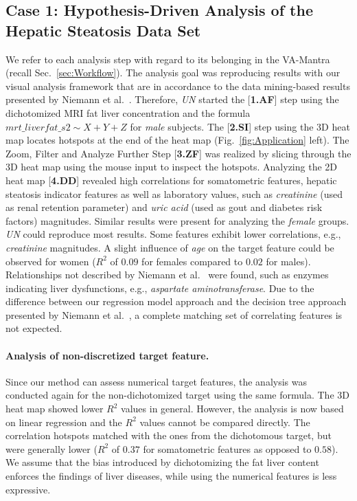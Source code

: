 \documentclass[journal]{style/vgtc} 			          %
\begin{document}
\subsection{Case 1: Hypothesis-Driven Analysis of the Hepatic Steatosis Data Set}
We refer to each analysis step with regard to its belonging in the VA-Mantra (recall Sec.~\ref{sec:Workflow}).
The analysis goal was reproducing results with our visual analysis framework that are in accordance to the data mining-based results presented by Niemann et al.~\cite{Niemann2014}.
Therefore, \emph{UN} started the [\textbf{1.AF}] step using the dichotomized MRI fat liver concentration and the formula $mrt\_liverfat\_s2 \sim X + Y + Z$ for \emph{male} subjects.
The [\textbf{2.SI}] step using the 3D heat map locates hotspots at the end of the heat map (Fig.~\ref{fig:Application} left).
The Zoom, Filter and Analyze Further Step [\textbf{3.ZF}] was realized by slicing through the 3D heat map using the mouse input to inspect the hotspots.
Analyzing the 2D heat map [\textbf{4.DD}] revealed high correlations for somatometric features, hepatic steatosis indicator features as well as laboratory values, such as \emph{creatinine} (used as renal retention parameter) and \emph{uric acid} (used as gout and diabetes risk factors) magnitudes.
Similar results were present for analyzing the \emph{female} groups.
\emph{UN} could reproduce most results.
Some features exhibit lower correlations, e.g., \emph{creatinine} magnitudes.
A slight influence of \emph{age} on the target feature could be observed for women ($R^2$ of $0.09$ for females compared to $0.02$ for males).
Relationships not described by Niemann et al.~\cite{Niemann2014} were found, such as enzymes indicating liver dysfunctions, e.g., \emph{aspartate aminotransferase}.
%
Due to the difference between our regression model approach and the decision tree approach presented by Niemann et al.~\cite{Niemann2014}, a complete matching set of correlating features is not expected.

\paragraph{Analysis of non-discretized target feature.}
Since our method can assess numerical target features, the analysis was conducted again for the non-dichotomized target using the same formula.
The 3D heat map showed lower $R^2$ values in general.
However, the analysis is now based on linear regression and the $R^2$ values cannot be compared directly.
The correlation hotspots matched with the ones from the dichotomous target, but were generally lower ($R^2$ of $0.37$ for somatometric features as opposed to $0.58$).
We assume that the bias introduced by dichotomizing the fat liver content enforces the findings of liver diseases, while using the numerical features is less expressive.
\end{document}
